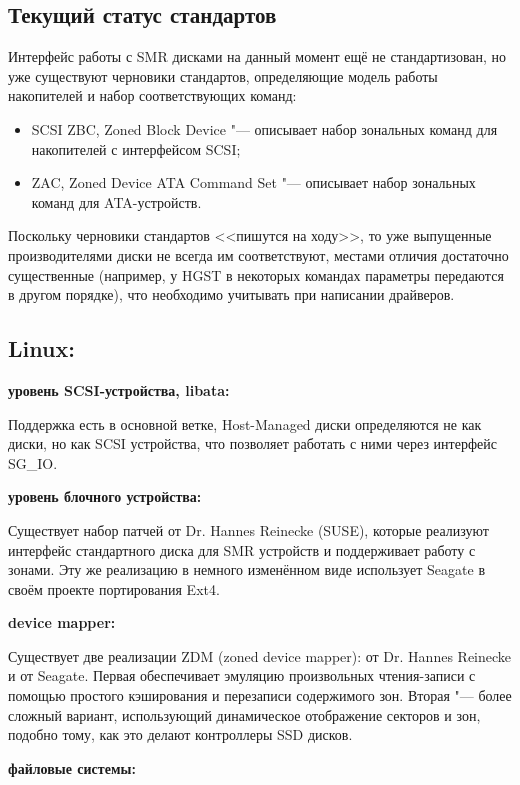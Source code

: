 \documentclass[10pt, a5paper]{article}
\begin{document}
\subsection*{Текущий статус стандартов}

Интерфейс работы с SMR дисками на данный момент ещё не стандартизован, но уже существуют черновики стандартов, определяющие модель работы накопителей и набор соответствующих команд:

\begin{itemize}
  \item SCSI ZBC, Zoned Block Device "--- описывает набор зональных команд для накопителей с   интерфейсом SCSI;
  \item ZAC, Zoned Device ATA Command Set "--- описывает набор зональных команд для ATA-устройств.
\end{itemize}

Поскольку черновики стандартов <<пишутся на ходу>>, то уже выпущенные производителями диски не всегда им соответствуют, местами отличия достаточно существенные (например, у HGST в некоторых командах параметры передаются в другом порядке), что необходимо учитывать при написании драйверов.

\subsection*{Linux:}

\textbf{уровень SCSI-устройства, libata:}

Поддержка есть в основной ветке, Host-Managed диски определяются не как диски, но как SCSI устройства, что позволяет работать с ними через интерфейс SG\_IO.

\textbf{уровень блочного устройства:}

Существует набор патчей от Dr. Hannes Reinecke (SUSE), которые реализуют интерфейс стандартного диска для SMR устройств и поддерживает работу с зонами. Эту же реализацию в немного изменённом виде использует Seagate в своём проекте портирования Ext4.

\textbf{device mapper:}

Существует две реализации ZDM (zoned device mapper): от Dr. Hannes Reinecke и от Seagate. Первая обеспечивает эмуляцию произвольных чтения-записи с помощью простого кэширования и перезаписи содержимого зон. Вторая "--- более сложный вариант, использующий динамическое отображение секторов и зон, подобно тому, как это делают контроллеры SSD дисков.

\textbf{файловые системы:}
\end{document}
